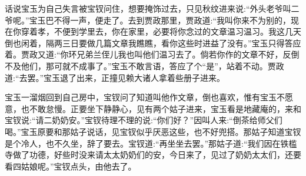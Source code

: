 


\begin{parag}
    话说宝玉为自己失言被宝钗问住，想要掩饰过去，只见秋纹进来说:“外头老爷叫二爷呢。”宝玉巴不得一声，便走了。去到贾政那里，贾政道:“我叫你来不为别的，现在你穿着孝，不便到学里去，你在家里，必要将你念过的文章温习温习。我这几天倒也闲着，隔两三日要做几篇文章我瞧瞧，看你这些时进益了没有。”宝玉只得答应着。贾政又道:“你环兄弟兰侄儿我也叫他们温习去了。倘若你作的文章不好，反倒不及他们，那可就不成事了。”宝玉不敢言语，答应了个“是”，站着不动。贾政道:“去罢。”宝玉退了出来，正撞见赖大诸人拿着些册子进来。
\end{parag}


\begin{parag}
    宝玉一溜烟回到自己房中，宝钗问了知道叫他作文章，倒也喜欢，惟有宝玉不愿意，也不敢怠慢。正要坐下静静心，见有两个姑子进来，宝玉看是地藏庵的，来和宝钗说:“请二奶奶安。”宝钗待理不理的说:“你们好？”因叫人来:“倒茶给师父们喝。”宝玉原要和那姑子说话，见宝钗似乎厌恶这些，也不好兜搭。那姑子知道宝钗是个冷人，也不久坐，辞了要去。宝钗道:“再坐坐去罢。”那姑子道:“我们因在铁槛寺做了功德，好些时没来请太太奶奶们的安，今日来了，见过了奶奶太太们，还要看四姑娘呢。”宝钗点头，由他去了。
\end{parag}


